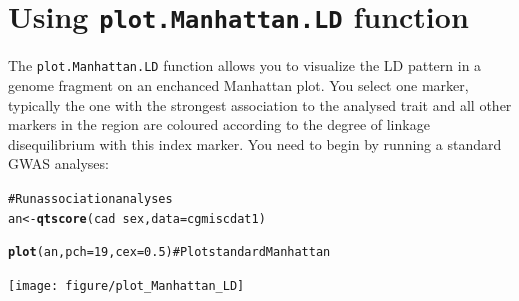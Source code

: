\documentclass{article}\usepackage{graphicx, color}
\makeatletter
\newcommand{\hlfunctioncall}[1]{\textcolor[rgb]{0.501960784313725,0,0.329411764705882}{\textbf{#1}}}%
\newcommand{\hlcomment}[1]{\textcolor[rgb]{0.180392156862745,0.6,0.341176470588235}{#1}}%
\newenvironment{kframe}{%
 \def\at@end@of@kframe{}%
 \ifinner\ifhmode%
  \def\at@end@of@kframe{\end{minipage}}%
  \begin{minipage}{\columnwidth}%
 \fi\fi%
 \def\FrameCommand##1{\hskip\@totalleftmargin \hskip-\fboxsep
 \colorbox{shadecolor}{##1}\hskip-\fboxsep
     \hskip-\linewidth \hskip-\@totalleftmargin \hskip\columnwidth}%
 \MakeFramed {\advance\hsize-\width
   \@totalleftmargin\z@ \linewidth\hsize
   \@setminipage}}%
 {\par\unskip\endMakeFramed%
 \at@end@of@kframe}
\newenvironment{knitrout}{}{} %
\makeatother
\begin{document}
\section{Using {\tt plot.Manhattan.LD} function}
The {\tt plot.Manhattan.LD} function allows you to visualize the LD pattern in a genome fragment on an enchanced Manhattan plot. You select one marker, typically the one with the strongest association to the analysed trait and all other markers in the region are coloured according to the degree of linkage disequilibrium with this index marker. You need to begin by running a standard GWAS analyses:
\begin{knitrout}
\color{fgcolor}\begin{kframe}
\begin{alltt}
\hlcomment{# Run association analyses}
an <- \hlfunctioncall{qtscore}(cad ~ sex, data = cgmiscdat1)
\end{alltt}


{\ttfamily\noindent\color{warningcolor}{\#\# Warning: binomial trait is analysed as gaussian}}

{\ttfamily\noindent\color{warningcolor}{\#\# Warning: 27 observations deleted due to missingness}}\begin{alltt}
\hlfunctioncall{plot}(an, pch = 19, cex = 0.5)  \hlcomment{# Plot standard Manhattan}
\end{alltt}
\end{kframe}
\texttt{[image: figure/plot\_Manhattan\_LD]} 

\end{knitrout}
\end{document}
